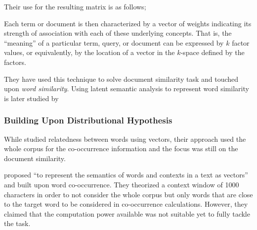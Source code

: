 Their use for the resulting matrix is as follows;
\begin{displayquote}
Each term or document is then characterized by a vector of weights indicating its strength of association with each of these underlying concepts.
That is, the \enquote{meaning} of a particular term, query, or document can be expressed by $k$ factor values, or equivalently, by the location of a vector in the $k$-space defined by the factors.
\end{displayquote}
They have used this technique to solve document similarity task and touched upon \emph{word similarity}.
Using latent semantic analysis to represent word similarity is later studied by \textcite{landauer_solution_1997}

\subsubsection{Building Upon Distributional Hypothesis}%
\label{ssub:building_upon_distributional_hypothesis}

While \citeauthor{deerwester_indexing_1990} studied relatedness between words using vectors, their approach used the whole corpus for the co-occurrence information and the focus was still on the document similarity.

\textcite{schutze_dimensions_1992} proposed \enquote{to represent the semantics of words and contexts in a text as vectors} and built upon word co-occurrence.
They theorized a context window of 1000 characters in order to not consider the whole corpus but only words that are close to the target word to be considered in co-occurrence calculations.
However, they claimed that the computation power available was not suitable yet to fully tackle the task.

